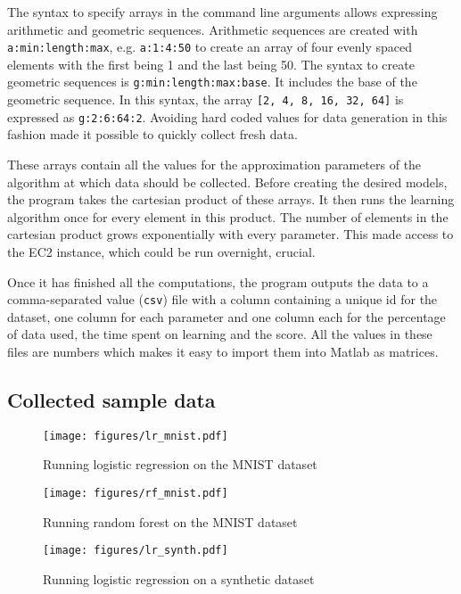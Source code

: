 \documentclass[a4paper,12pt,twoside,openright]{report}
\begin{document}
The syntax to specify arrays in the command line arguments allows expressing arithmetic and geometric sequences. Arithmetic sequences are created with \texttt{a:min:length:max}, e.g. \texttt{a:1:4:50} to create an array of four evenly spaced elements with the first being 1 and the last being 50. The syntax to create geometric sequences is \texttt{g:min:length:max:base}. It includes the base of the geometric sequence. In this syntax, the array \texttt{[2, 4, 8, 16, 32, 64]} is expressed as \texttt{g:2:6:64:2}. Avoiding hard coded values for data generation in this fashion made it possible to quickly collect fresh data.
	
These arrays contain all the values for the approximation parameters of the algorithm at which data should be collected. Before creating the desired models, the program takes the cartesian product of these arrays. It then runs the learning algorithm once for every element in this product. The number of elements in the cartesian product grows exponentially with every parameter. This made access to the EC2 instance, which could be run overnight, crucial.

Once it has finished all the computations, the program outputs the data to a comma-separated value (\texttt{csv}) file with a column containing a unique id for the dataset, one column for each parameter and one column each for the percentage of data used, the time spent on learning and the score. All the values in these files are numbers which makes it easy to import them into Matlab as matrices. 

\subsection{Collected sample data}

\begin{figure}
\centering
  \texttt{[image: figures/lr\_mnist.pdf]}
  \caption{Running logistic regression on the MNIST dataset}
  \label{sampledata1}
\end{figure}

\begin{figure}
\centering
  \texttt{[image: figures/rf\_mnist.pdf]}
  \caption{Running random forest on the MNIST dataset}
  \label{sampledata2}
\end{figure}

\begin{figure}
\centering
  \texttt{[image: figures/lr\_synth.pdf]}
  \caption{Running logistic regression on a synthetic dataset}
  \label{sampledata3}
\end{figure}
\end{document}
